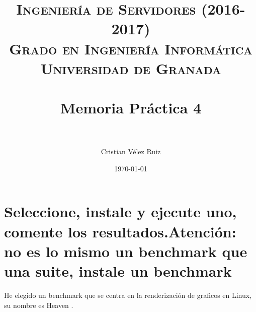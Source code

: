 
\usepackage{listings}
\usepackage{python}


\title{	
\normalfont \normalsize 
\textsc{\textbf{Ingeniería de Servidores (2016-2017)} \\ Grado en Ingeniería Informática \\ Universidad de Granada} \\ [25pt] %
\horrule{0.5pt} \\[0.4cm] %
\huge Memoria Práctica 4 \\ %
\horrule{2pt} \\[0.5cm] %
}

\author{Cristian Vélez Ruiz} %

\date{\normalsize\today} %



\maketitle %

\newpage %

\tableofcontents %

\listoffigures

\listoftables

\newpage

\section[Cuestión 1]{Seleccione, instale y ejecute uno, comente los resultados.Atención: no es lo mismo un benchmark que una suite, instale un benchmark}

He elegido un benchmark que se centra en la renderización de graficos en Linux, su nombre es Heaven \cite{heaven}.

